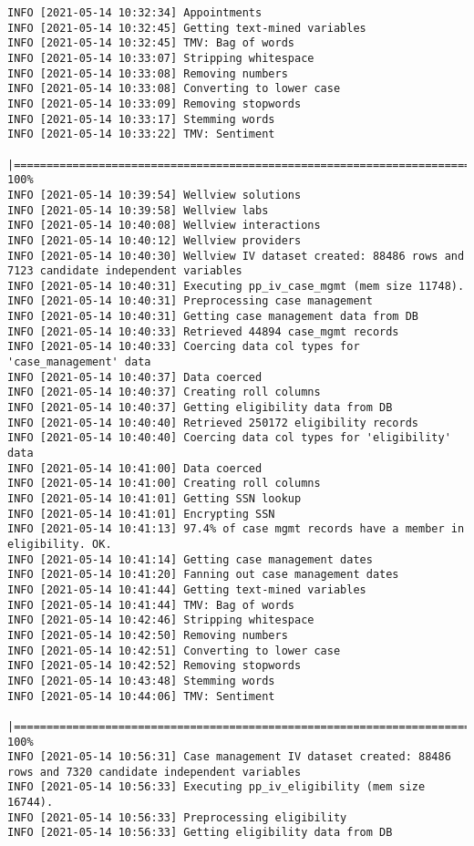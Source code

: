 \documentclass[
]{book}
\begin{document}
\begin{verbatim}
INFO [2021-05-14 10:32:34] Appointments
INFO [2021-05-14 10:32:45] Getting text-mined variables
INFO [2021-05-14 10:32:45] TMV: Bag of words
INFO [2021-05-14 10:33:07] Stripping whitespace
INFO [2021-05-14 10:33:08] Removing numbers
INFO [2021-05-14 10:33:08] Converting to lower case
INFO [2021-05-14 10:33:09] Removing stopwords
INFO [2021-05-14 10:33:17] Stemming words
INFO [2021-05-14 10:33:22] TMV: Sentiment
  |===============================================================================================================| 100%
INFO [2021-05-14 10:39:54] Wellview solutions
INFO [2021-05-14 10:39:58] Wellview labs
INFO [2021-05-14 10:40:08] Wellview interactions
INFO [2021-05-14 10:40:12] Wellview providers
INFO [2021-05-14 10:40:30] Wellview IV dataset created: 88486 rows and 7123 candidate independent variables
INFO [2021-05-14 10:40:31] Executing pp_iv_case_mgmt (mem size 11748).
INFO [2021-05-14 10:40:31] Preprocessing case management
INFO [2021-05-14 10:40:31] Getting case management data from DB
INFO [2021-05-14 10:40:33] Retrieved 44894 case_mgmt records
INFO [2021-05-14 10:40:33] Coercing data col types for 'case_management' data
INFO [2021-05-14 10:40:37] Data coerced
INFO [2021-05-14 10:40:37] Creating roll columns
INFO [2021-05-14 10:40:37] Getting eligibility data from DB
INFO [2021-05-14 10:40:40] Retrieved 250172 eligibility records
INFO [2021-05-14 10:40:40] Coercing data col types for 'eligibility' data
INFO [2021-05-14 10:41:00] Data coerced
INFO [2021-05-14 10:41:00] Creating roll columns
INFO [2021-05-14 10:41:01] Getting SSN lookup
INFO [2021-05-14 10:41:01] Encrypting SSN
INFO [2021-05-14 10:41:13] 97.4% of case mgmt records have a member in eligibility. OK.
INFO [2021-05-14 10:41:14] Getting case management dates
INFO [2021-05-14 10:41:20] Fanning out case management dates
INFO [2021-05-14 10:41:44] Getting text-mined variables
INFO [2021-05-14 10:41:44] TMV: Bag of words
INFO [2021-05-14 10:42:46] Stripping whitespace
INFO [2021-05-14 10:42:50] Removing numbers
INFO [2021-05-14 10:42:51] Converting to lower case
INFO [2021-05-14 10:42:52] Removing stopwords
INFO [2021-05-14 10:43:48] Stemming words
INFO [2021-05-14 10:44:06] TMV: Sentiment
  |===============================================================================================================| 100%
INFO [2021-05-14 10:56:31] Case management IV dataset created: 88486 rows and 7320 candidate independent variables
INFO [2021-05-14 10:56:33] Executing pp_iv_eligibility (mem size 16744).
INFO [2021-05-14 10:56:33] Preprocessing eligibility
INFO [2021-05-14 10:56:33] Getting eligibility data from DB

\end{verbatim}
\end{document}
